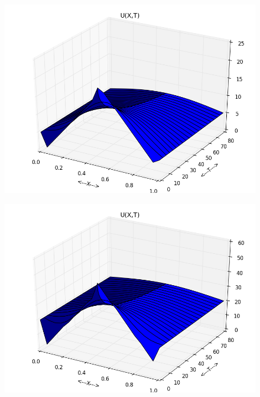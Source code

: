 \documentclass[letterpaper, 11 pt, conference]{ieeeconf}
\begin{document}
\begin{figure}
\includegraphics[scale=0.35]{plot_test_original_tri_2.png}
\end{figure}

\begin{figure}
\includegraphics[scale=0.35]{plot_test_original_tri_3.png}
\end{figure}
\end{document}
